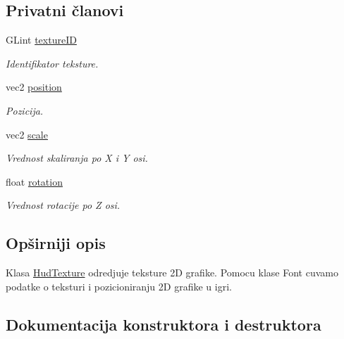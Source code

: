 \subsection*{Privatni članovi}
\begin{DoxyCompactItemize}
\item 
G\+Lint \hyperlink{classhud_1_1HudTexture_a20e3ae1a3d5aa9c53a6ed33bce25ec2e}{texture\+ID}
\begin{DoxyCompactList}\small\item\em Identifikator teksture. \end{DoxyCompactList}\item 
vec2 \hyperlink{classhud_1_1HudTexture_af4151cf971b1e2cafb4368bc58f224eb}{position}
\begin{DoxyCompactList}\small\item\em Pozicija. \end{DoxyCompactList}\item 
vec2 \hyperlink{classhud_1_1HudTexture_af4fb370dbaffb1604a886368daa72507}{scale}
\begin{DoxyCompactList}\small\item\em Vrednost skaliranja po X i Y osi. \end{DoxyCompactList}\item 
float \hyperlink{classhud_1_1HudTexture_a79336d9ce1cc8ffb719355442b3b27c0}{rotation}
\begin{DoxyCompactList}\small\item\em Vrednost rotacije po Z osi. \end{DoxyCompactList}\end{DoxyCompactItemize}


\subsection{Opširniji opis}
Klasa \hyperlink{classhud_1_1HudTexture}{Hud\+Texture} odredjuje teksture 2D grafike. Pomocu klase Font cuvamo podatke o teksturi i pozicioniranju 2D grafike u igri. 

\subsection{Dokumentacija konstruktora i destruktora}
\mbox{\label{classhud_1_1HudTexture_a45488fac00a2f9e558bda7f71f526e66}} 
